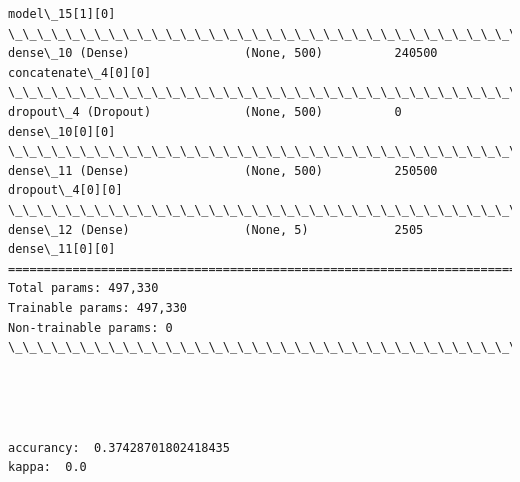 \documentclass[11pt]{article}
\begin{document}
\begin{Verbatim}[commandchars=\\\{\}]
                                                                 model\_15[1][0]                   
\_\_\_\_\_\_\_\_\_\_\_\_\_\_\_\_\_\_\_\_\_\_\_\_\_\_\_\_\_\_\_\_\_\_\_\_\_\_\_\_\_\_\_\_\_\_\_\_\_\_\_\_\_\_\_\_\_\_\_\_\_\_\_\_\_\_\_\_\_\_\_\_\_\_\_\_\_\_\_\_\_\_\_\_\_\_\_\_\_\_\_\_\_\_\_\_\_\_
dense\_10 (Dense)                (None, 500)          240500      concatenate\_4[0][0]              
\_\_\_\_\_\_\_\_\_\_\_\_\_\_\_\_\_\_\_\_\_\_\_\_\_\_\_\_\_\_\_\_\_\_\_\_\_\_\_\_\_\_\_\_\_\_\_\_\_\_\_\_\_\_\_\_\_\_\_\_\_\_\_\_\_\_\_\_\_\_\_\_\_\_\_\_\_\_\_\_\_\_\_\_\_\_\_\_\_\_\_\_\_\_\_\_\_\_
dropout\_4 (Dropout)             (None, 500)          0           dense\_10[0][0]                   
\_\_\_\_\_\_\_\_\_\_\_\_\_\_\_\_\_\_\_\_\_\_\_\_\_\_\_\_\_\_\_\_\_\_\_\_\_\_\_\_\_\_\_\_\_\_\_\_\_\_\_\_\_\_\_\_\_\_\_\_\_\_\_\_\_\_\_\_\_\_\_\_\_\_\_\_\_\_\_\_\_\_\_\_\_\_\_\_\_\_\_\_\_\_\_\_\_\_
dense\_11 (Dense)                (None, 500)          250500      dropout\_4[0][0]                  
\_\_\_\_\_\_\_\_\_\_\_\_\_\_\_\_\_\_\_\_\_\_\_\_\_\_\_\_\_\_\_\_\_\_\_\_\_\_\_\_\_\_\_\_\_\_\_\_\_\_\_\_\_\_\_\_\_\_\_\_\_\_\_\_\_\_\_\_\_\_\_\_\_\_\_\_\_\_\_\_\_\_\_\_\_\_\_\_\_\_\_\_\_\_\_\_\_\_
dense\_12 (Dense)                (None, 5)            2505        dense\_11[0][0]                   
==================================================================================================
Total params: 497,330
Trainable params: 497,330
Non-trainable params: 0
\_\_\_\_\_\_\_\_\_\_\_\_\_\_\_\_\_\_\_\_\_\_\_\_\_\_\_\_\_\_\_\_\_\_\_\_\_\_\_\_\_\_\_\_\_\_\_\_\_\_\_\_\_\_\_\_\_\_\_\_\_\_\_\_\_\_\_\_\_\_\_\_\_\_\_\_\_\_\_\_\_\_\_\_\_\_\_\_\_\_\_\_\_\_\_\_\_\_

    \end{Verbatim}

    \begin{center}
    \end{center}
    { \hspace*{\fill} \\}
    
    \begin{center}
    \end{center}
    { \hspace*{\fill} \\}
    
    \begin{Verbatim}[commandchars=\\\{\}]
accurancy:  0.37428701802418435
kappa:  0.0

    \end{Verbatim}
\end{document}
